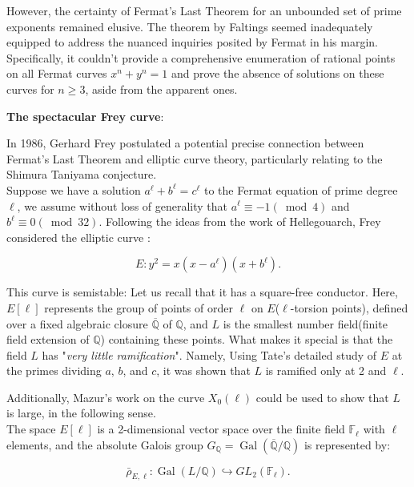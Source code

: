 However, the certainty of Fermat's Last Theorem for an unbounded set of prime exponents remained elusive. The theorem by Faltings seemed inadequately equipped to address the nuanced inquiries posited by Fermat in his margin. Specifically, it couldn’t provide a comprehensive enumeration of rational points on all Fermat curves \(x^{n}+y^{n}=1\) and prove the absence of solutions on these curves for \(n \geq 3\), aside from the apparent ones.\\
\vspace{1cm}
\begin{center}
\textbf{The spectacular Frey curve}: \\   
\end{center}
In 1986, Gerhard Frey postulated a potential precise connection between Fermat's Last Theorem and elliptic curve theory, particularly relating to the Shimura Taniyama conjecture. \\


Suppose we have a solution \(a^{\ell}+b^{\ell}=c^{\ell}\) to the Fermat equation of prime degree \(\ell\), we assume without loss of generality that \(a^{\ell} \equiv-1(\bmod 4)\) and \(b^{\ell} \equiv 0(\bmod 32)\). Following the ideas from the work of Hellegouarch\cite{He}, Frey considered the elliptic curve\cite{Fr} :

\[
E: y^{2}=x(x-a^{\ell})(x+b^{\ell}).
\]

This curve is semistable: Let us recall that it has a square-free conductor. Here, \(E[\ell]\) represents the group of points of order \(\ell\) on \(E\)($\ell$-torsion points), defined over a fixed algebraic closure \(\overline{\mathbb{Q}}\) of \(\mathbb{Q}\), and \(L\) is the smallest number field(finite field extension of $\mathbb{Q}$) containing these points. What makes it special is that the field \(L\) has "\textit{very little ramification}". Namely, Using Tate’s detailed study of \(E\) at the primes dividing \(a\), \(b\), and \(c\), it was shown that \(L\) is ramified only at 2 and \(\ell\).

Additionally, Mazur's work on the curve \(X_{0}(\ell)\) could be used to show that \(L\) is large, in the following sense.\\ The space \(E[\ell]\) is a 2-dimensional vector space over the finite field \(\mathbb{F}_{\ell}\) with \(\ell\) elements, and the absolute Galois group \(G_{\mathbb{Q}}=\operatorname{Gal}(\overline{\mathbb{Q}} / \mathbb{Q})\) is represented by:

\[
\bar{\rho}_{E, \ell}: \operatorname{Gal}(L / \mathbb{Q}) \hookrightarrow GL_{2}(\mathbb{F}_{\ell}).
\]

